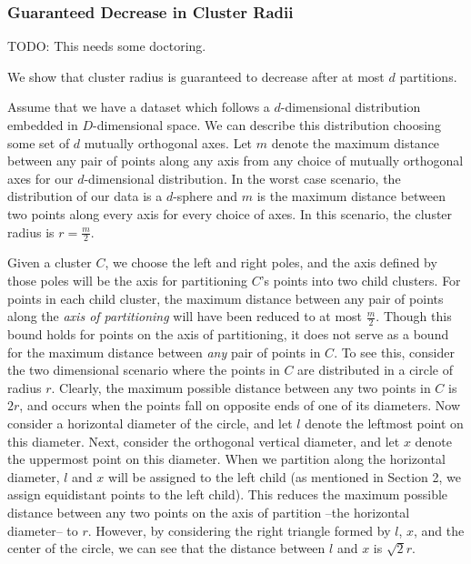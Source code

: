\subsubsection {Guaranteed Decrease in Cluster Radii}
\label{subsubsec:methods:guaranteed-decrease-in-cluster-radii}

TODO: This needs some doctoring. 

We show that cluster radius is guaranteed to decrease after at most $d$ partitions.

Assume that we have a dataset which follows a $d$-dimensional distribution embedded in $D$-dimensional space.
We can describe this distribution choosing some set of $d$ mutually orthogonal axes.
Let $m$ denote the maximum distance between any pair of points along any axis from any choice of mutually orthogonal axes for our $d$-dimensional distribution.
In the worst case scenario, the distribution of our data is a $d$-sphere and $m$ is the maximum distance between two points along every axis for every choice of axes.
In this scenario, the cluster radius is $r = \frac{m}{2}$.

Given a cluster $C$, we choose the left and right poles, 
and the axis defined by those poles will be the axis for partitioning  $C$'s points into two child clusters.
For points in each child cluster, the maximum distance between any pair of points along the \emph{axis of partitioning} will have been reduced to at most $\frac{m}{2}$.
Though this bound holds for points on the axis of partitioning, it does not serve as a bound for the maximum distance between \emph{any} pair of points in  $C$.
To see this, consider the two dimensional scenario where the points in  $C$ are distributed in a circle of radius $r$. Clearly, the maximum possible distance between 
any two points in  $C$ is $2r$, and occurs when the points fall on opposite ends of one of its diameters. Now consider a horizontal diameter of the circle, 
and let $l$ denote the leftmost point on this diameter. Next, consider the orthogonal vertical diameter, and let $x$ denote the uppermost point on this diameter. When we 
partition along the horizontal diameter, $l$ and $x$ will be assigned to the left child (as mentioned in Section 2, we assign equidistant points to the left child). 
This reduces the maximum possible distance between any two points on the axis of partition --the horizontal diameter-- to $r$. However, by considering the 
right triangle formed by $l$, $x$, and the center of the circle, we can see that the distance between 
$l$ and $x$ is $\sqrt{2}{r}$.


